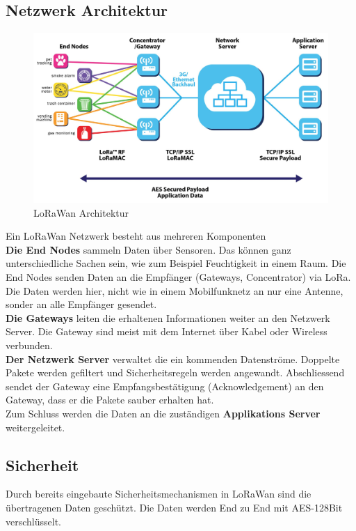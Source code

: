 \documentclass[11pt,english,german]{report}
\theoremstyle{definition}
\begin{document}
\subsection{Netzwerk Architektur}
\begin{figure}[H]
	\centering
	\includegraphics[width=\textwidth]{img/lora/lorawantopology.jpg}
	\caption[LoRaWan Architektur]
	{LoRaWan Architektur}
\end{figure}
Ein LoRaWan Netzwerk besteht aus mehreren Komponenten\\[0.3cm]
\textbf{Die End Nodes} sammeln Daten über Sensoren. Das können ganz unterschiedliche Sachen sein, wie zum Beispiel Feuchtigkeit in einem Raum. Die End Nodes senden Daten an die Empfänger (Gateways, Concentrator) via LoRa. Die Daten werden hier, nicht wie in einem Mobilfunknetz an nur eine Antenne, sonder an alle Empfänger gesendet.\\[0.3cm]
\textbf{Die Gateways} leiten die erhaltenen Informationen weiter an den Netzwerk Server. Die Gateway sind meist mit dem Internet über Kabel oder Wireless verbunden.\\[0.3cm]
\textbf{Der Netzwerk Server} verwaltet die ein kommenden Datenströme. Doppelte Pakete werden gefiltert und Sicherheitsregeln werden angewandt. Abschliessend sendet der Gateway eine Empfangsbestätigung (Acknowledgement) an den Gateway, dass er die Pakete sauber erhalten hat.\\[0.3cm]
Zum Schluss werden die Daten an die zuständigen \textbf{Applikations Server} weitergeleitet.

\newpage
\subsection{Sicherheit}
Durch bereits eingebaute Sicherheitsmechanismen in LoRaWan sind die übertragenen Daten geschützt. Die Daten werden End zu End mit AES-128Bit verschlüsselt.
\end{document}
